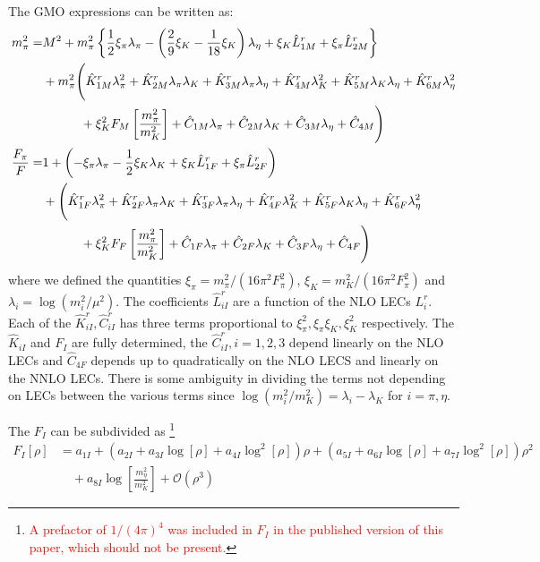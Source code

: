 \documentclass[12pt,a4paper]{article}
\begin{document}
The GMO expressions can be written as:
\begin{align}
m_\pi^2 =& M^2 + m_\pi^2 \left\{ \frac{1}{2}\xi_\pi\lambda_\pi -\left(\frac{2}{9}\xi_K-\frac{1}{18}\xi_K\right)\lambda_\eta +\xi_K \hat L_{1M}^r + \xi_\pi \hat L_{2M}^r \right\} \nonumber\\ &
+ m_\pi^2\Bigg(  \hat K_{1M}^r \lambda_\pi^2 + \hat K_{2M}^r \lambda_\pi\lambda_K
+ \hat K_{3M}^r \lambda_\pi\lambda_\eta
+ \hat K_{4M}^r \lambda_K^2
+ \hat K_{5M}^r \lambda_K\lambda_\eta
+ \hat K_{6M}^r \lambda_\eta^2 \nonumber\\ & \hspace*{7ex}
+ \xi_K^2 F_M \left[\frac{m_\pi^2}{m_K^2}\right]
+ \hat C_{1M} \lambda_\pi+\hat C_{2M}\lambda_K+\hat C_{3M}\lambda_\eta
+ \hat C_{4M}
\Bigg)
\nonumber\\
\frac{F_\pi}{F} =& 1 + \left(-\xi_\pi\lambda_\pi-\frac{1}{2}\xi_K\lambda_K
+\xi_K \hat L_{1F}^r + \xi_\pi \hat L_{2F}^r\right)
\nonumber\\ &
+\Bigg( \hat K_{1F}^r \lambda_\pi^2
+ \hat K_{2F}^r \lambda_\pi\lambda_K
+ \hat K_{3F}^r \lambda_\pi\lambda_\eta
+ \hat K_{4F}^r \lambda_K^2
+ \hat K_{5F}^r \lambda_K\lambda_\eta
+ \hat K_{6F}^r \lambda_\eta^2
\nonumber\\ & \hspace*{7ex}
+ \xi_K^2 F_F\left[ \frac{m_\pi^2}{m_K^2} \right]
+ \hat C_{1F}\lambda_\pi+\hat C_{2F}\lambda_K+\hat C_{3F}\lambda_\eta
+ \hat C_{4F}
\Bigg)
\end{align}
where we defined the quantities $\xi_\pi=m_\pi^2/(16\pi^2 F_\pi^2)$, $\xi_K= m_K^2/(16\pi^2 F_\pi^2)$ and $\lambda_i = \log(m_i^2/\mu^2)$. The coefficients $\hat L^r_{iI}$ are a function of the NLO LECs $L_i^r$. Each of the $\hat K_{iI}^r,\hat C_{iI}^r$ has three terms proportional to $\xi_\pi^2,\xi_\pi\xi_K,\xi_K^2$ respectively.
The $\hat K_{iI}$ and $F_I$ are fully determined, the $\hat C_{iI}^r, i=1,2,3$ depend linearly on the NLO LECs
and $\hat C_{4F}$ depends up to quadratically on the NLO LECS and linearly on the NNLO LECs. There is some ambiguity in dividing the terms not depending on LECs between the various terms since $\log(m_i^2/m_K^2)=\lambda_i-\lambda_K$ for $i=\pi,\eta$.

The $F_I$ can be subdivided as \footnote{ \textcolor{red}{ A prefactor of $1/(4\pi)^4$ was included in $F_I$ in the published version of this paper, which should not be present.} }
\begin{align}
	F_I [ \rho ] &= a_{1I} + \left( a_{2I} + a_{3I} \log[\rho] + a_{4I} \log^2[\rho] \right) \rho + \left( a_{5I} + a_{6I} \log[\rho] + a_{7I} \log^2[\rho] \right) \rho^2 \nonumber \\
	& \quad + a_{8I} \log \left[ \frac{m^2_{\eta}}{m_K^2} \right] + \mathcal{O} \left( \rho^3 \right) 
\end{align}
\end{document}
